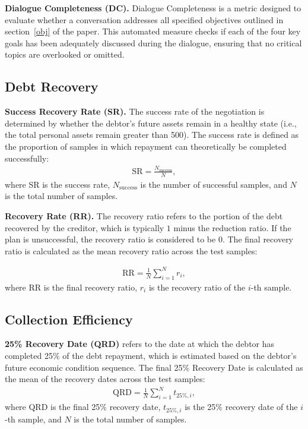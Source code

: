 \textbf{Dialogue Completeness (DC).} Dialogue Completeness is a metric designed to evaluate whether a conversation addresses all specified objectives outlined in section~\ref{obj} of the paper. This automated measure checks if each of the four key goals has been adequately discussed during the dialogue, ensuring that no critical topics are overlooked or omitted.

\subsection{Debt Recovery} \label{app:me_rec}

\textbf{Success Recovery Rate (SR). }The success rate of the negotiation is determined by whether the debtor's future assets remain in a healthy state (i.e., the total personal assets remain greater than 500). The success rate is defined as the proportion of samples in which repayment can theoretically be completed successfully:
\begin{equation}\label{eq:utility}
\begin{split}
\text{SR} = \frac{N_{\text{success}}}{N},
\end{split}
\end{equation}
where SR is the success rate, $N_{\text{success}}$ is the number of successful samples, and \(N\) is the total number of samples.

\textbf{Recovery Rate (RR). }The recovery ratio refers to the portion of the debt recovered by the creditor, which is typically $1$ minus the reduction ratio. If the plan is unsuccessful, the recovery ratio is considered to be $0$. The final recovery ratio is calculated as the mean recovery ratio across the test samples:

\begin{equation}
\begin{split}
\text{RR} = \frac{1}{N} \sum_{i=1}^{N} r_i,
\end{split}
\end{equation}
where RR is the final recovery ratio, \(r_i\) is the recovery ratio of the \(i\)-th sample.


\subsection{Collection Efficiency} \label{app:me_col}

\textbf{25\% Recovery Date (QRD)} refers to the date at which the debtor has completed 25\% of the debt repayment, which is estimated based on the debtor's future economic condition sequence. The final 25\% Recovery Date is calculated as the mean of the recovery dates across the test samples:
\begin{equation}
\begin{split}
\text{QRD} = \frac{1}{N} \sum_{i=1}^{N} t_{25\%,i},
\end{split}
\end{equation}
where QRD is the final 25\% recovery date, $t_{25\%,i}$ is the 25\% recovery date of the $i$-th sample, and $N$ is the total number of samples.


